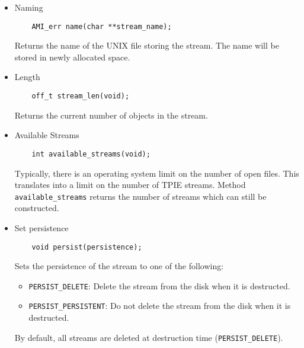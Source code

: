 \begin{itemize}
\item{Naming}

\begin{verbatim}
    AMI_err name(char **stream_name);
\end{verbatim}

Returns the name of the UNIX file storing the stream.  The
name will be stored in newly allocated space.

\item{Length}

\begin{verbatim}
    off_t stream_len(void);
\end{verbatim}

Returns the current number of objects in the stream.

\item{Available Streams}
\begin{verbatim}
    int available_streams(void);    
\end{verbatim}

Typically, there is an operating system limit on the number
of open files. This translates into a limit on the number of
TPIE streams. Method \verb|available_streams| returns the
number of streams which can still be constructed.

\item{Set persistence}

\begin{verbatim}
    void persist(persistence);
\end{verbatim}

Sets the persistence of the stream to one of the following:
\begin{itemize}
\item \verb|PERSIST_DELETE|: Delete the stream from the disk when it is
  destructed.
\item \verb|PERSIST_PERSISTENT|: Do not delete the stream from the disk when
  it is destructed.
\end{itemize}

By default, all streams are deleted at destruction time
(\verb|PERSIST_DELETE|).
\end{itemize}


